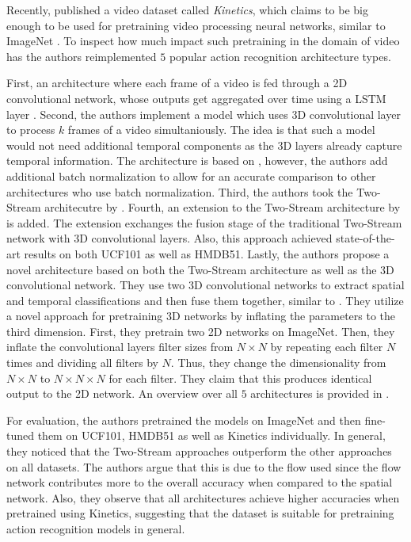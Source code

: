 Recently, \cite{carreira_quo_2017} published a video dataset called \textit{Kinetics}, which claims to be big enough to be used for pretraining video processing neural networks, similar to ImageNet \cite{deng_imagenet:_2009}.
To inspect how much impact such pretraining in the domain of video has the authors reimplemented $5$ popular action recognition architecture types.

First, an architecture where each frame of a video is fed through a 2D convolutional network, whose outputs get aggregated over time using a LSTM layer \cite{hochreiter_long_1997}.
Second, the authors implement a model which uses 3D convolutional layer to process $k$ frames of a video simultaniously.
The idea is that such a model would not need additional temporal components as the 3D layers already capture temporal information.
The architecture is based on \cite{tran_learning_2015}, however, the authors add additional batch normalization to allow for an accurate comparison to other architectures who use batch normalization.
Third, the authors took the Two-Stream architecutre by \cite{simonyan_two-stream_2014}.
Fourth, an extension to the Two-Stream architecture by \cite{feichtenhofer_convolutional_2016} is added.
The extension exchanges the fusion stage of the traditional Two-Stream network with 3D convolutional layers.
Also, this approach achieved state-of-the-art results on both UCF101 as well as HMDB51.
Lastly, the authors propose a novel architecture based on both the Two-Stream architecture as well as the 3D convolutional network.
They use two 3D convolutional networks to extract spatial and temporal classifications and then fuse them together, similar to \cite{simonyan_two-stream_2014}.
They utilize a novel approach for pretraining 3D networks by inflating the parameters to the third dimension.
First, they pretrain two 2D networks on ImageNet.
Then, they inflate the convolutional layers filter sizes from $N \times N$ by repeating each filter $N$ times and dividing all filters by $N$.
Thus, they change the dimensionality from $N \times N$ to $N \times N \times N$ for each filter.
They claim that this produces identical output to the 2D network. 
An overview over all $5$ architectures is provided in .

For evaluation, the authors pretrained the models on ImageNet and then fine-tuned them on UCF101, HMDB51 as well as Kinetics individually.
In general, they noticed that the Two-Stream approaches outperform the other approaches on all datasets.
The authors argue that this is due to the flow used since the flow network contributes more to the overall accuracy when compared to the spatial network.
Also, they observe that all architectures achieve higher accuracies when pretrained using Kinetics, suggesting that the dataset is suitable for pretraining action recognition models in general.

